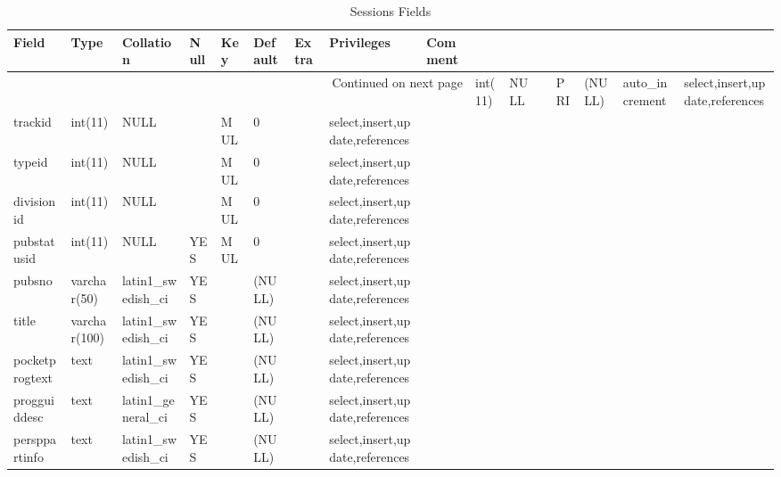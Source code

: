 \documentclass[tablesignature,landscape]{scrartcl}
\begin{document}
\begin{longtable}{|l|l|l|l|l|l|l|l|l|}
\caption{Sessions Fields} \label{tbl:sessionsfields}\\
\hline
 Field           &  Type          &  Collation                &  Null  &  Key  &  Default               &  Extra              &  Privileges                       &  Comment \\
\hline
\endhead
\hline\multicolumn{9}{r}{Continued on next page}\
\endfoot
\endlastfoot
\hline
 sessionid       &  int(11)       &  NULL                     &        &  PRI  &  (NULL)                &  auto\_{}increment  &  select,insert,update,references  &           \\
 trackid         &  int(11)       &  NULL                     &        &  MUL  &  0                     &                     &  select,insert,update,references  &           \\
 typeid          &  int(11)       &  NULL                     &        &  MUL  &  0                     &                     &  select,insert,update,references  &           \\
 divisionid      &  int(11)       &  NULL                     &        &  MUL  &  0                     &                     &  select,insert,update,references  &           \\
 pubstatusid     &  int(11)       &  NULL                     &  YES   &  MUL  &  0                     &                     &  select,insert,update,references  &           \\
 pubsno          &  varchar(50)   &  latin1\_{}swedish\_{}ci  &  YES   &       &  (NULL)                &                     &  select,insert,update,references  &           \\
 title           &  varchar(100)  &  latin1\_{}swedish\_{}ci  &  YES   &       &  (NULL)                &                     &  select,insert,update,references  &           \\
 pocketprogtext  &  text          &  latin1\_{}swedish\_{}ci  &  YES   &       &  (NULL)                &                     &  select,insert,update,references  &           \\
 progguiddesc    &  text          &  latin1\_{}general\_{}ci  &  YES   &       &  (NULL)                &                     &  select,insert,update,references  &           \\
 persppartinfo   &  text          &  latin1\_{}swedish\_{}ci  &  YES   &       &  (NULL)                &                     &  select,insert,update,references  &           \\

\end{longtable}
\end{document}
